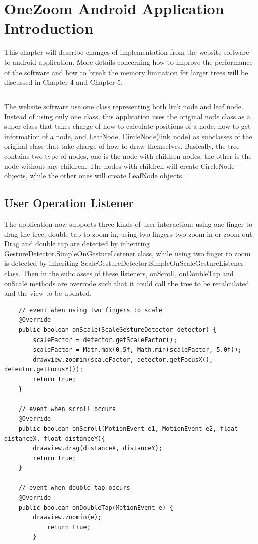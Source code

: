 \documentclass[MSc]{icldt}
\begin{document}
\chapter{OneZoom Android Application Introduction}

This chapter will describe changes of implementation from the website software to android application. More details concerning how to improve the performance of the software and how to break the memory limitation for larger trees will be discussed in Chapter 4 and Chapter 5.

\section{ }


The website software use one class representing both link node and leaf node. Instead of using only one class, this application uses the original node class as a super class that takes charge of how to calculate positions of a node, how to get information of a node, and LeafNode, CircleNode(link node) as subclasses of the original class that take charge of how to draw themselves. Basically, the tree contains two type of nodes, one is the node with children nodes, the other is the node without any children. The nodes with children will create CircleNode objects, while the other ones will create LeafNode objects. 

\section{User Operation Listener}

The application now supports three kinds of user interaction: using one finger to drag the tree, double tap to zoom in, using two fingers two zoom in or zoom out. Drag and double tap are detected by inheriting GestureDetector.SimpleOnGestureListener class, while using two finger to zoom is detected by inheriting ScaleGestureDetector.SimpleOnScaleGestureListener class. Then in the subclasses of these listeners, onScroll, onDoubleTap and onScale methods are overrode such that it could call the tree to be recalculated and the view to be updated. 

\begin{lstlisting}
	// event when using two fingers to scale
	@Override
	public boolean onScale(ScaleGestureDetector detector) {
		scaleFactor = detector.getScaleFactor();
		scaleFactor = Math.max(0.5f, Math.min(scaleFactor, 5.0f));
		drawview.zoomin(scaleFactor, detector.getFocusX(), detector.getFocusY());
		return true;
	}
	
	// event when scroll occurs
	@Override
	public boolean onScroll(MotionEvent e1, MotionEvent e2, float distanceX, float distanceY){
		drawview.drag(distanceX, distanceY);
		return true;
	}
	
	// event when double tap occurs    
	@Override
	public boolean onDoubleTap(MotionEvent e) {
		drawview.zoomin(e);
    		return true;
        }

\end{lstlisting}
\end{document}
